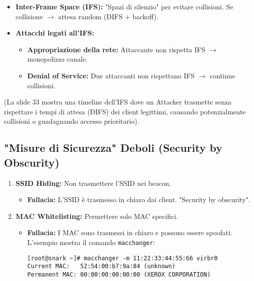 \begin{itemize}
    \item \textbf{Inter-Frame Space (IFS):} "Spazi di silenzio" per evitare collisioni.
    Se collisione $\rightarrow$ attesa random (DIFS + backoff).
    \item \textbf{Attacchi legati all'IFS:}
    \begin{itemize}
        \item \textbf{Appropriazione della rete:} Attaccante non rispetta IFS $\rightarrow$ monopolizza canale.
        \item \textbf{Denial of Service:} Due attaccanti non rispettano IFS $\rightarrow$ continue collisioni.
    \end{itemize}
\end{itemize}
(La slide 33 mostra una timeline dell'IFS dove un Attacker trasmette senza rispettare i tempi di attesa (DIFS) dei client legittimi, causando potenzialmente collisioni o guadagnando accesso prioritario).

\subsection{"Misure di Sicurezza" Deboli (Security by Obscurity)}
\begin{enumerate}
    \item \textbf{SSID Hiding:} Non trasmettere l'SSID nei beacon.
    \begin{itemize}
        \item \textbf{Fallacia:} L'SSID è trasmesso in chiaro dai client. "Security by obscurity".
    \end{itemize}
    \item \textbf{MAC Whitelisting:} Permettere solo MAC specifici.
    \begin{itemize}
        \item \textbf{Fallacia:} I MAC sono trasmessi in chiaro e possono essere spoofati.
        L'esempio mostra il comando \texttt{macchanger}:
\begin{verbatim}
[root@snark ~]# macchanger -m 11:22:33:44:55:66 virbr0
Current MAC:   52:54:00:b7:9a:84 (unknown)
Permanent MAC: 00:00:00:00:00:00 (XEROX CORPORATION)
\end{verbatim}
    \end{itemize}
\end{enumerate}

